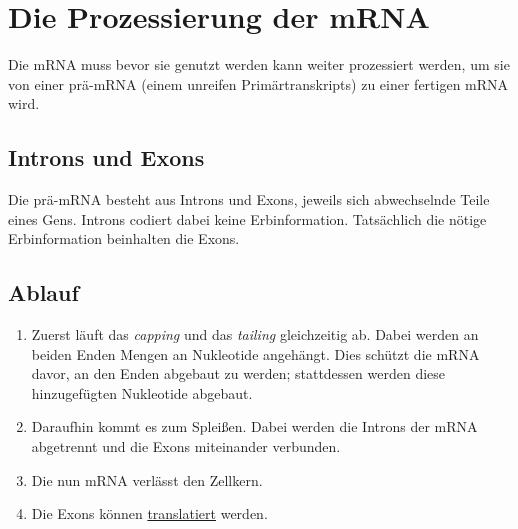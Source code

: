\documentclass{article}
\begin{document}
\section{Die Prozessierung der mRNA}
Die mRNA muss bevor sie genutzt werden kann weiter prozessiert werden, um sie von einer prä-mRNA (einem unreifen Primärtranskripts) zu einer fertigen mRNA wird. 
 
\subsection{Introns und Exons}
Die prä-mRNA besteht aus Introns und Exons, jeweils sich abwechselnde Teile eines Gens. Introns codiert dabei keine Erbinformation. Tatsächlich die nötige Erbinformation beinhalten die Exons.
 
\subsection{Ablauf}
\begin{enumerate}
 \item Zuerst läuft das \emph{capping} und das \emph{tailing} gleichzeitig ab. Dabei werden an beiden Enden Mengen an Nukleotide angehängt. Dies schützt die mRNA davor, an den Enden abgebaut zu werden; stattdessen werden diese hinzugefügten Nukleotide abgebaut.
 \item Daraufhin kommt es zum Spleißen. Dabei werden die Introns der mRNA abgetrennt und die Exons miteinander verbunden.
 \item Die nun  mRNA verlässt den Zellkern.
 \item Die Exons können \hyperref[Die Translation]{translatiert} werden.
\end{enumerate} 
\end{document}
